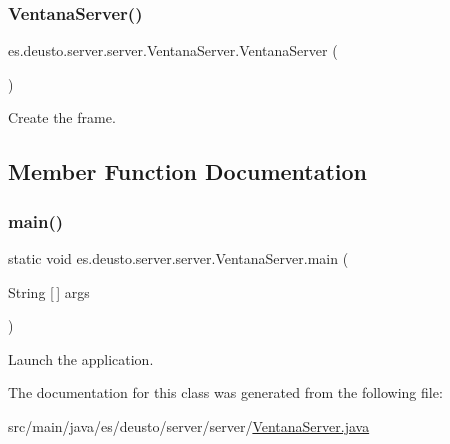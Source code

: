 \subsubsection{\texorpdfstring{VentanaServer()}{VentanaServer()}}
{\footnotesize\ttfamily es.\+deusto.\+server.\+server.\+Ventana\+Server.\+Ventana\+Server (\begin{DoxyParamCaption}{ }\end{DoxyParamCaption})}

Create the frame. 

\subsection{Member Function Documentation}
\mbox{\label{classes_1_1deusto_1_1server_1_1server_1_1_ventana_server_ab7df8e019ee3a79b0adaab0dd6bb0cd7}} 
\subsubsection{\texorpdfstring{main()}{main()}}
{\footnotesize\ttfamily static void es.\+deusto.\+server.\+server.\+Ventana\+Server.\+main (\begin{DoxyParamCaption}\item[{String \mbox{[}$\,$\mbox{]}}]{args }\end{DoxyParamCaption})\hspace{0.3cm}{\ttfamily [static]}}

Launch the application. 

The documentation for this class was generated from the following file\+:\begin{DoxyCompactItemize}
\item 
src/main/java/es/deusto/server/server/\mbox{\hyperlink{_ventana_server_8java}{Ventana\+Server.\+java}}\end{DoxyCompactItemize}
